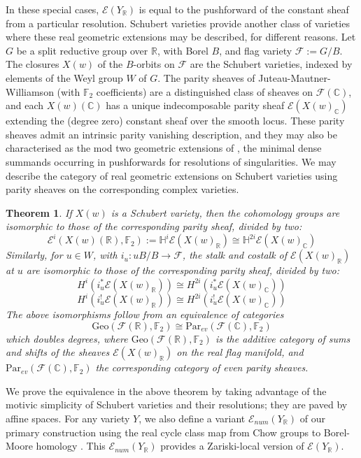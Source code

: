 \documentclass{amsart}
\newtheorem{thm}{Theorem}[section]
\theoremstyle{definition}
\theoremstyle{remark}
\begin{document}
In these special cases, $\mathscr{E}(Y_\mathbb{R})$ is equal to the pushforward of the constant sheaf from a particular resolution. Schubert varieties provide another class of varieties where these real geometric extensions may be described, for different reasons. Let $G$ be a split reductive group over $\mathbb{R}$, with Borel $B$, and flag variety $\mathscr{F}:=G/B$. The closures $X(w)$ of the $B$-orbits on $\mathscr{F}$ are the Schubert varieties, indexed by elements of the Weyl group $W$ of $G$. The parity sheaves of Juteau-Mautner-Williamson \cite{ParitysheavesJMW} (with $\mathbb{F}_2$ coefficients) are a distinguished class of sheaves on $\mathscr{F}(\mathbb{C})$, and each $X(w)(\mathbb{C})$ has a unique indecomposable parity sheaf $\mathscr{E}(X(w)_\mathbb{C})$ extending the (degree zero) constant sheaf over the smooth locus. These parity sheaves admit an intrinsic parity vanishing description, and they may also be characterised as the mod two geometric extensions of \cite{HoneWilliamson2025}, the minimal dense summands occurring in pushforwards for resolutions of singularities. We may describe the category of real geometric extensions on Schubert varieties using parity sheaves on the corresponding complex varieties.

\begin{thm}
If $X(w)$ is a Schubert variety, then the cohomology groups are isomorphic to those of the corresponding parity sheaf, divided by two:
\[\mathscr{E}^i(X(w)(\mathbb{R}),\mathbb{F}_2):=\mathbb{H}^i\mathscr{E}(X(w)_\mathbb{R})\cong \mathbb{H}^{2i}\mathscr{E}(X(w)_\mathbb{C})\]
Similarly, for $u\in W$, with $i_u:uB/B\to \mathscr{F}$, the stalk and costalk of $\mathscr{E}({X(w)}_\mathbb{R})$ at $u$ are isomorphic to those of the corresponding parity sheaf, divided by two:
\[H^i(i_u^*\mathscr{E}(X(w)_\mathbb{R}))\cong H^{2i}(i_u^*\mathscr{E}(X(w)_\mathbb{C}))\]
    \[H^i(i_u^!\mathscr{E}(X(w)_\mathbb{R}))\cong H^{2i}(i_u^!\mathscr{E}(X(w)_\mathbb{C}))\]
The above isomorphisms follow from an equivalence of categories \[\mathrm{Geo}(\mathscr{F}(\mathbb{R}),\mathbb{F}_2)\cong \mathrm{Par}_{ev}(\mathscr{F}(\mathbb{C}),\mathbb{F}_2)\] which doubles degrees, where $\mathrm{Geo}(\mathscr{F}(\mathbb{R}),\mathbb{F}_2)$ is the additive category of sums and shifts of the sheaves $\mathscr{E}(X(w)_\mathbb{R})$ on the real flag manifold, and $\mathrm{Par}_{ev}(\mathscr{F}(\mathbb{C}),\mathbb{F}_2)$ the corresponding category of even parity sheaves. 
\end{thm}

We prove the equivalence in the above theorem by taking advantage of the motivic simplicity of Schubert varieties and their resolutions; they are paved by affine spaces. For any variety $Y$, we also define a variant $\mathscr{E}_{num}(Y_\mathbb{R})$ of our primary construction using the real cycle class map from Chow groups to Borel-Moore homology \cite{BorelHaefliger}. This $\mathscr{E}_{num}(Y_\mathbb{R})$ provides a Zariski-local version of $\mathscr{E}(Y_\mathbb{R})$.
\end{document}
